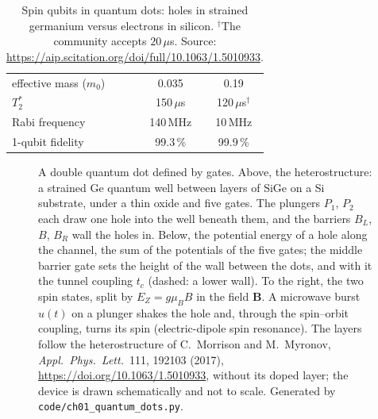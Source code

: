 \documentclass[handoutsbeamer.tex]{subfiles}
\begin{document}
\begin{frame}
{\begin{table}[h]
\begin{tabular}{@{}lcc@{}}
effective mass ($m_0$) & 0.035 & 0.19\\
$T_2^*$ & 150\,$\mu$s & 120\,$\mu$s$^{\dagger}$\\
Rabi frequency & 140\,MHz & 10\,MHz\\
1-qubit fidelity & 99.3\,\% & 99.9\,\%\\
\end{tabular}
\caption{Spin qubits in quantum dots: holes in strained germanium versus electrons in silicon. $^\dagger$The community accepts $20\,\mu$s. Source: \url{https://aip.scitation.org/doi/full/10.1063/1.5010933}.}\label{tab:ch01:quantum_dots}
\end{table}
\begin{figure}[h]\centering
\resizebox{0.62\linewidth}{!}{}
\caption{A double quantum dot defined by gates. Above, the heterostructure: a strained Ge quantum well between layers of SiGe on a Si substrate, under a thin oxide and five gates. The plungers $P_1$, $P_2$ each draw one hole into the well beneath them, and the barriers $B_L$, $B$, $B_R$ wall the holes in. Below, the potential energy of a hole along the channel, the sum of the potentials of the five gates; the middle barrier gate sets the height of the wall between the dots, and with it the tunnel coupling $t_c$ (dashed: a lower wall). To the right, the two spin states, split by $E_Z=g\mu_B B$ in the field $\mathbf B$. A microwave burst $u(t)$ on a plunger shakes the hole and, through the spin--orbit coupling, turns its spin (electric-dipole spin resonance). The layers follow the heterostructure of C.~Morrison and M.~Myronov, \emph{Appl.\ Phys.\ Lett.}\ 111, 192103 (2017), \url{https://doi.org/10.1063/1.5010933}, without its doped layer; the device is drawn schematically and not to scale. Generated by \texttt{code/ch01\_quantum\_dots.py}.}\label{fig:ch01:quantum_dots}
\end{figure}}
\end{frame}
\end{document}

